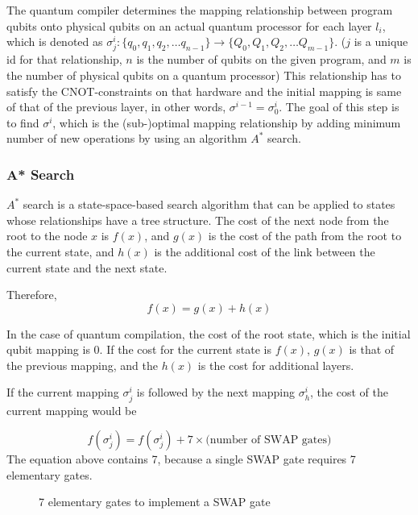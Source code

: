 The quantum compiler determines the mapping relationship between program qubits onto physical qubits on an actual quantum processor for each layer $l_i$, which is denoted as $\sigma^i_j: \{q_0, q_1, q_2, \dots q_{n-1}\} \rightarrow \{Q_0, Q_1, Q_2, \dots Q_{m-1}\}$. ($j$ is a unique id for that relationship, $n$ is the number of qubits on the given program, and $m$ is the number of physical qubits on a quantum processor) This relationship has to satisfy the CNOT-constraints on that hardware and the initial mapping is same of that of the previous layer, in other words, $\sigma^{i-1} = \sigma^i_0$.  The goal of this step is to find $\sigma^{i}$, which is the (sub-)optimal mapping relationship by adding minimum number of new operations by using an algorithm $A^{*}$ search.

\subsubsection{A* Search}
$A^{*}$ search is a state-space-based search algorithm that can be applied to states whose relationships have a tree structure.  The cost of the next node from the root to the node $x$ is $f(x)$, and $g(x)$ is the cost of the path from the root to the current state, and $h(x)$ is the additional cost of the link between the current state and the next state.　


Therefore, 
\begin{equation}
f(x) = g(x) + h(x)
\end{equation}

In the case of quantum compilation, the cost of the root state, which is the initial qubit mapping is 0. If the cost for the current state is $f(x)$, $g(x)$ is that of the previous mapping, and the $h(x)$ is the cost for additional layers.

If the current mapping $\sigma^i_j$ is followed by the next mapping  $\sigma^i_h$, the cost of the current mapping would be

\begin{equation}
 f(\sigma^i_j) = f(\sigma^i_j) + 7 \times \textrm{(number of SWAP gates)} 
\end{equation}
The equation above contains 7, because a single SWAP gate requires 7 elementary gates.

\begin{figure}[ht]
	\begin{center}
		\caption{7 elementary gates to implement a SWAP gate}
	\end{center}
\end{figure}

